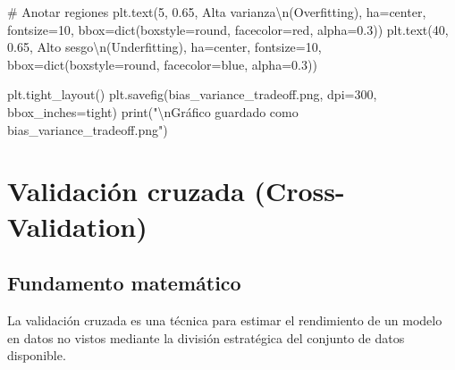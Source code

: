 \documentclass[
  doc,
  floatsintext,
  longtable,
  a4paper,
  nolmodern,
  notxfonts,
  notimes,
  12pt,
  colorlinks=true,linkcolor=blue,citecolor=blue,urlcolor=blue]{apa7}
\newenvironment{Shaded}{\begin{snugshade}}{\end{snugshade}}
\newcommand{\BuiltInTok}[1]{\textcolor[rgb]{0.00,0.23,0.31}{#1}}
\newcommand{\CharTok}[1]{\textcolor[rgb]{0.13,0.47,0.30}{#1}}
\newcommand{\CommentTok}[1]{\textcolor[rgb]{0.37,0.37,0.37}{#1}}
\newcommand{\DecValTok}[1]{\textcolor[rgb]{0.68,0.00,0.00}{#1}}
\newcommand{\FloatTok}[1]{\textcolor[rgb]{0.68,0.00,0.00}{#1}}
\newcommand{\NormalTok}[1]{\textcolor[rgb]{0.00,0.23,0.31}{#1}}
\newcommand{\OperatorTok}[1]{\textcolor[rgb]{0.37,0.37,0.37}{#1}}
\newcommand{\StringTok}[1]{\textcolor[rgb]{0.13,0.47,0.30}{#1}}
\begin{document}
\begin{Shaded}
\begin{Highlighting}[]
\CommentTok{\# Anotar regiones}
\NormalTok{plt.text(}\DecValTok{5}\NormalTok{, }\FloatTok{0.65}\NormalTok{, }\StringTok{\textquotesingle{}Alta varianza}\CharTok{\textbackslash{}n}\StringTok{(Overfitting)\textquotesingle{}}\NormalTok{, }
\NormalTok{         ha}\OperatorTok{=}\StringTok{\textquotesingle{}center\textquotesingle{}}\NormalTok{, fontsize}\OperatorTok{=}\DecValTok{10}\NormalTok{, bbox}\OperatorTok{=}\BuiltInTok{dict}\NormalTok{(boxstyle}\OperatorTok{=}\StringTok{\textquotesingle{}round\textquotesingle{}}\NormalTok{, facecolor}\OperatorTok{=}\StringTok{\textquotesingle{}red\textquotesingle{}}\NormalTok{, alpha}\OperatorTok{=}\FloatTok{0.3}\NormalTok{))}
\NormalTok{plt.text(}\DecValTok{40}\NormalTok{, }\FloatTok{0.65}\NormalTok{, }\StringTok{\textquotesingle{}Alto sesgo}\CharTok{\textbackslash{}n}\StringTok{(Underfitting)\textquotesingle{}}\NormalTok{, }
\NormalTok{         ha}\OperatorTok{=}\StringTok{\textquotesingle{}center\textquotesingle{}}\NormalTok{, fontsize}\OperatorTok{=}\DecValTok{10}\NormalTok{, bbox}\OperatorTok{=}\BuiltInTok{dict}\NormalTok{(boxstyle}\OperatorTok{=}\StringTok{\textquotesingle{}round\textquotesingle{}}\NormalTok{, facecolor}\OperatorTok{=}\StringTok{\textquotesingle{}blue\textquotesingle{}}\NormalTok{, alpha}\OperatorTok{=}\FloatTok{0.3}\NormalTok{))}

\NormalTok{plt.tight\_layout()}
\NormalTok{plt.savefig(}\StringTok{\textquotesingle{}bias\_variance\_tradeoff.png\textquotesingle{}}\NormalTok{, dpi}\OperatorTok{=}\DecValTok{300}\NormalTok{, bbox\_inches}\OperatorTok{=}\StringTok{\textquotesingle{}tight\textquotesingle{}}\NormalTok{)}
\BuiltInTok{print}\NormalTok{(}\StringTok{"}\CharTok{\textbackslash{}n}\StringTok{Gráfico guardado como \textquotesingle{}bias\_variance\_tradeoff.png\textquotesingle{}"}\NormalTok{)}
\end{Highlighting}
\end{Shaded}

\section{Validación cruzada
(Cross-Validation)}\label{validaciuxf3n-cruzada-cross-validation}

\subsection{Fundamento matemático}\label{fundamento-matemuxe1tico}

La validación cruzada es una técnica para estimar el rendimiento de un
modelo en datos no vistos mediante la división estratégica del conjunto
de datos disponible.
\end{document}
